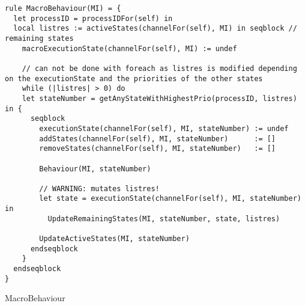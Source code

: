 \begin{listing}[H]
\begin{verbatim}
rule MacroBehaviour(MI) = {
  let processID = processIDFor(self) in
  local listres := activeStates(channelFor(self), MI) in seqblock // remaining states
    macroExecutionState(channelFor(self), MI) := undef

    // can not be done with foreach as listres is modified depending on the executionState and the priorities of the other states
    while (|listres| > 0) do
    let stateNumber = getAnyStateWithHighestPrio(processID, listres) in {
      seqblock
        executionState(channelFor(self), MI, stateNumber) := undef
        addStates(channelFor(self), MI, stateNumber)      := []
        removeStates(channelFor(self), MI, stateNumber)   := []

        Behaviour(MI, stateNumber)

        // WARNING: mutates listres!
        let state = executionState(channelFor(self), MI, stateNumber) in
          UpdateRemainingStates(MI, stateNumber, state, listres)

        UpdateActiveStates(MI, stateNumber)
      endseqblock
    }
  endseqblock
}
\end{verbatim}
\caption{MacroBehaviour}
\label{lst:asm:MacroBehaviour}
\end{listing}




